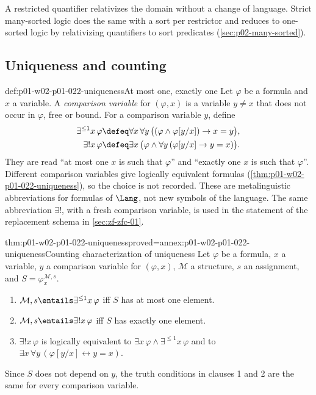 A restricted quantifier relativizes the domain without a change of
language. Strict many-sorted logic does the same with a sort per restrictor
and reduces to one-sorted logic by relativizing quantifiers to sort
predicates (\cref{sec:p02-many-sorted}).

\subsection{Uniqueness and counting}
\label{sec:p01-w02-p01-022-uniqueness}

\begin{hbdefinition}{def:p01-w02-p01-022-uniqueness}{At most one, exactly one}
Let \(\varphi\) be a formula and \(x\) a variable. A \emph{comparison
variable} for \((\varphi,x)\) is a variable \(y\ne x\) that does not occur in
\(\varphi\), free or bound. For a comparison variable \(y\), define
\[
\begin{aligned}
  \exists^{\leq1}x\,\varphi
  &\defeq\forall x\,\forall y\,\bigl((\varphi\land\varphi[y/x])\to x=y\bigr),\\
  \exists!x\,\varphi
  &\defeq\exists x\,\bigl(\varphi\land\forall y\,(\varphi[y/x]\to y=x)\bigr).
\end{aligned}
\]
They are read ``at most one \(x\) is such that \(\varphi\)'' and ``exactly one
\(x\) is such that \(\varphi\)''. Different comparison variables give
logically equivalent formulas (\cref{thm:p01-w02-p01-022-uniqueness}), so the
choice is not recorded. These are metalinguistic abbreviations for formulas
of \(\Lang\), not new symbols of the language. The same abbreviation
\(\exists!\), with a fresh comparison variable, is used in the statement
of the replacement schema in \cref{sec:zf-zfc-01}.
\end{hbdefinition}

\begin{hbtheorem}{thm:p01-w02-p01-022-uniqueness}{proved=annex:p01-w02-p01-022-uniqueness}{Counting characterization of uniqueness}
Let \(\varphi\) be a formula, \(x\) a variable, \(y\) a comparison variable
for \((\varphi,x)\), \(\mathcal M\) a structure, \(s\) an assignment, and
\(S=\varphi^{\mathcal M,s}_x\).
\begin{enumerate}
  \item \(\mathcal M,s\entails\exists^{\leq1}x\,\varphi\) iff \(S\) has at
        most one element.
  \item \(\mathcal M,s\entails\exists!x\,\varphi\) iff \(S\) has exactly one
        element.
  \item \(\exists!x\,\varphi\) is logically equivalent to
        \(\exists x\,\varphi\land\exists^{\leq1}x\,\varphi\) and to
        \(\exists x\,\forall y\,(\varphi[y/x]\leftrightarrow y=x)\).
\end{enumerate}
Since \(S\) does not depend on \(y\), the truth conditions in clauses 1 and 2
are the same for every comparison variable.
\end{hbtheorem}

